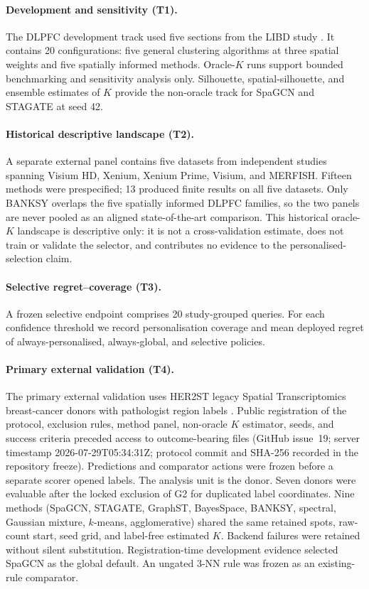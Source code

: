 \documentclass[12pt]{article}
\begin{document}
\paragraph{Development and sensitivity (T1).}
The DLPFC development track used five sections from the LIBD study
\citep{maynard2021}. It contains 20 configurations: five general clustering
algorithms at three spatial weights and five spatially informed methods.
Oracle-\(K\) runs support bounded benchmarking and sensitivity analysis only.
Silhouette, spatial-silhouette, and ensemble estimates of \(K\) provide the
non-oracle track for SpaGCN and STAGATE at seed 42.

\paragraph{Historical descriptive landscape (T2).}
A separate external panel contains five datasets from independent studies
spanning Visium HD, Xenium, Xenium Prime, Visium, and MERFISH. Fifteen methods
were prespecified; 13 produced finite results on all five datasets. Only
BANKSY overlaps the five spatially informed DLPFC families, so the two panels
are never pooled as an aligned state-of-the-art comparison. This historical
oracle-\(K\) landscape is descriptive only: it is not a cross-validation
estimate, does not train or validate the selector, and contributes no evidence
to the personalised-selection claim.

\paragraph{Selective regret--coverage (T3).}
A frozen selective endpoint comprises 20 study-grouped queries. For each
confidence threshold we record personalisation coverage and mean deployed
regret of always-personalised, always-global, and selective policies.

\paragraph{Primary external validation (T4).}
The primary external validation uses HER2ST legacy Spatial Transcriptomics
breast-cancer donors with pathologist region labels
\citep{andersson2021}. Public registration of the protocol, exclusion rules,
method panel, non-oracle \(K\) estimator, seeds, and success criteria preceded
access to outcome-bearing files (GitHub issue~19; server timestamp
2026-07-29T05:34:31Z; protocol commit and SHA-256 recorded in the repository
freeze). Predictions and comparator actions were frozen before a separate
scorer opened labels. The analysis unit is the donor. Seven donors were
evaluable after the locked exclusion of G2 for duplicated label coordinates.
Nine methods (SpaGCN, STAGATE, GraphST, BayesSpace, BANKSY, spectral,
Gaussian mixture, \(k\)-means, agglomerative) shared the same retained spots,
raw-count start, seed grid, and label-free estimated \(K\). Backend failures
were retained without silent substitution. Registration-time development
evidence selected SpaGCN as the global default. An ungated 3-NN rule was
frozen as an existing-rule comparator.
\end{document}
